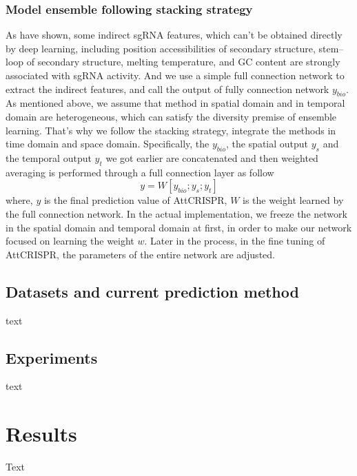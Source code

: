 \documentclass{bioinfo}
\begin{document}
\subsubsection{Model ensemble following stacking strategy}

As \citeauthor{wang2019optimized,Li2016ProteinSS,Wang2016ProteinSS} have shown, some indirect sgRNA features, which can't be obtained directly by deep learning, including position accessibilities of secondary structure, stem–loop of secondary structure, melting temperature, and GC content are strongly associated with sgRNA activity. 
And we use a simple full connection network to extract the indirect features, and call the output of fully connection network $y_{bio}$. 
As mentioned above, we assume that method in spatial domain and in temporal domain are heterogeneous, which can satisfy the diversity premise of ensemble learning.
That's why we follow the stacking strategy, integrate the methods in time domain and space domain. 
Specifically, the $y_{bio}$, the spatial output $y_{s}$ and the temporal output $y_{t}$ we got earlier are concatenated and then weighted averaging is performed through a full connection layer as follow
\begin{equation}
y=W[y_{bio};y_s;y_t]\label{eq:20}
\end{equation}
where, $y$ is the final prediction value of AttCRISPR, $W$ is the weight learned by the full connection network. 
In the actual implementation, we freeze the network in the spatial domain and temporal domain at first, in order to make our network focused on learning the weight $w$.
Later in the process, in the fine tuning of AttCRISPR, the parameters of the entire network are adjusted.

\subsection{Datasets and current prediction method}

text

\subsection{Experiments}

text

\section{Results}

Text
\end{document}
